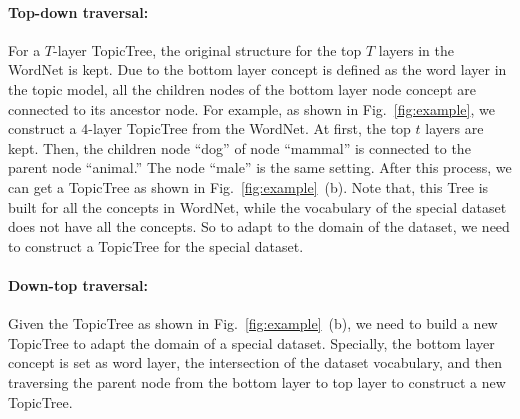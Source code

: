 \documentclass{article}
\begin{document}
\paragraph{Top-down traversal:} For a $T$-layer TopicTree, the original structure for the top $T$ layers in the WordNet is kept. Due to the bottom layer concept is defined as the word layer in the topic model, all the children nodes of the bottom layer node concept are connected to its ancestor node. For example,  as shown in Fig.~\ref{fig:example},  we construct a $\text{4}$-layer TopicTree from the WordNet. At first, the top $t$ layers are kept. Then, the children node ``dog'' of node ``mammal'' is connected to the parent node ``animal.'' The node ``male'' is the same setting. After this process, we can get a TopicTree as shown in Fig.~\ref{fig:example}~(b). Note that, this Tree is built for all the concepts in WordNet, while the vocabulary of the special dataset does not have all the concepts. So to adapt to the domain of the dataset, we need to construct a TopicTree for the special dataset.  

\paragraph{Down-top traversal:} Given the TopicTree as shown in  Fig.~\ref{fig:example}~(b), we need to build a new TopicTree to adapt the domain of a special dataset. Specially, the bottom layer concept is set as word layer,  the intersection of the dataset vocabulary, and then traversing the parent node from the bottom layer to top layer to construct a new TopicTree. 

\end{document}
